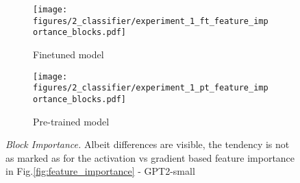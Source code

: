 
\begin{figure}[h]
\centering
\begin{subfigure}{.5\textwidth}
  \centering
  \texttt{[image: figures/2\_classifier/experiment\_1\_ft\_feature\_importance\_blocks.pdf]}
  \caption{Finetuned model}
\end{subfigure}%
\begin{subfigure}{.5\textwidth}
  \centering
  \texttt{[image: figures/2\_classifier/experiment\_1\_pt\_feature\_importance\_blocks.pdf]}
  \caption{Pre-trained model}
\end{subfigure}
  \caption{\textit{Block Importance.} Albeit differences are visible, the tendency is not as marked as for the activation vs gradient based feature importance in Fig.\ref{fig:feature_importance} - GPT2-small}
\label{fig:block_importance}
\end{figure}